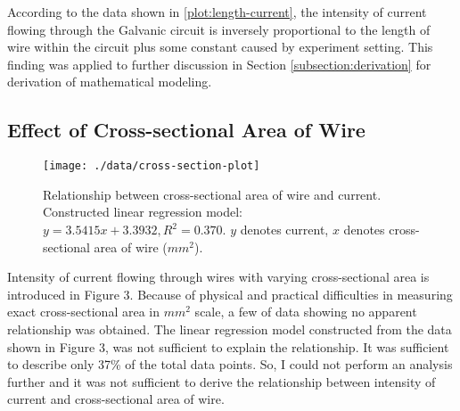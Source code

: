 According to the data shown in \ref{plot:length-current}, the intensity of current flowing through the Galvanic circuit is inversely proportional to the length of wire within the circuit plus some constant caused by experiment setting.
This finding was applied to further discussion in Section \ref{subsection:derivation} for derivation of mathematical modeling.

\subsection{Effect of Cross-sectional Area of Wire}
\label{subsection:cross-section-current}

\begin{figure}[!t]
  \centering

  \texttt{[image: ./data/cross-section-plot]}

  \caption{Relationship between cross-sectional area of wire and current. Constructed linear regression model: $y = 3.5415x + 3.3932, R^2 = 0.370$. $y$ denotes current, $x$ denotes cross-sectional area of wire ($mm^2$).}
  \label{plot:cross-section-current}
\end{figure}

Intensity of current flowing through wires with varying cross-sectional area is introduced in Figure 3.
Because of physical and practical difficulties in measuring exact cross-sectional area in $mm^2$ scale, a few of data showing no apparent relationship was obtained.
The linear regression model constructed from the data shown in Figure 3, was not sufficient to explain the relationship.
It was sufficient to describe only 37\% of the total data points.
So, I could not perform an analysis further and it was not sufficient to derive the relationship between intensity of current and cross-sectional area of wire.

\label{subsection:derivation}

